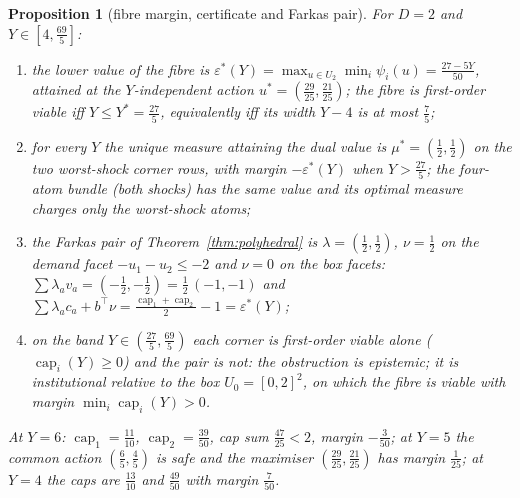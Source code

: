\documentclass[11pt,a4paper]{article}
\theoremstyle{plain}
\newtheorem{proposition}[theorem]{Proposition}
\theoremstyle{definition}
\theoremstyle{remark}
\newcommand{\capi}[1]{\operatorname{cap}_{#1}}
\newcommand{\tfr}[2]{\tfrac{#1}{#2}}
\begin{document}
\begin{proposition}[fibre margin, certificate and Farkas pair]\label{prop:benchmark}
For $D=2$ and $Y\in[4,\tfr{69}5]$:
\begin{enumerate}[leftmargin=1.6em,itemsep=1pt]
\item[(i)] the lower value of the fibre is $\varepsilon^\ast(Y)=\max_{u\in U_2}\min_i\psi_i(u)=\tfr{27-5Y}{50}$, attained at the $Y$-independent action $u^\ast=(\tfr{29}{25},\tfr{21}{25})$; the fibre is first-order viable iff $Y\le Y^\ast=\tfr{27}5$, equivalently iff its width $Y-4$ is at most $\tfr75$;
\item[(ii)] for every $Y$ the unique measure attaining the dual value is $\mu^\ast=(\tfr12,\tfr12)$ on the two worst-shock corner rows, with margin $-\varepsilon^\ast(Y)$ when $Y>\tfr{27}5$; the four-atom bundle (both shocks) has the same value and its optimal measure charges only the worst-shock atoms;
\item[(iii)] the Farkas pair of Theorem~\ref{thm:polyhedral} is $\lambda=(\tfr12,\tfr12)$, $\nu=\tfr12$ on the demand facet $-u_1-u_2\le-2$ and $\nu=0$ on the box facets: $\sum\lambda_av_a=(-\tfr12,-\tfr12)=\tfr12\,(-1,-1)$ and $\sum\lambda_ac_a+b^\top\nu=\tfr{\capi{1}+\capi{2}}{2}-1=\varepsilon^\ast(Y)$;
\item[(iv)] on the band $Y\in(\tfr{27}5,\tfr{69}5)$ each corner is first-order viable alone ($\capi{i}(Y)\ge0$) and the pair is not: the obstruction is epistemic; it is institutional relative to the box $U_0=[0,2]^2$, on which the fibre is viable with margin $\min_i\capi{i}(Y)>0$.
\end{enumerate}
At $Y=6$: $\capi{1}=\tfr{11}{10}$, $\capi{2}=\tfr{39}{50}$, cap sum $\tfr{47}{25}<2$, margin $-\tfr3{50}$; at $Y=5$ the common action $(\tfr65,\tfr45)$ is safe and the maximiser $(\tfr{29}{25},\tfr{21}{25})$ has margin $\tfr1{25}$; at $Y=4$ the caps are $\tfr{13}{10}$ and $\tfr{49}{50}$ with margin $\tfr7{50}$.
\end{proposition}
\end{document}

